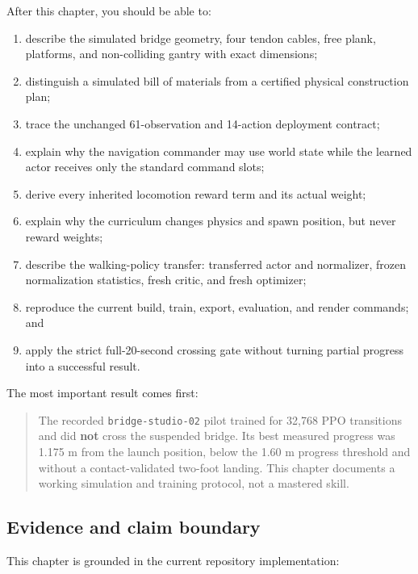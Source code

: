 \documentclass[
  american,
  11pt,
  letterpaper,
]{article}
\providecommand{\tightlist}{%
  \setlength{\itemsep}{0pt}\setlength{\parskip}{0pt}}
\begin{document}
After this chapter, you should be able to:

\begin{enumerate}
\def\labelenumi{\arabic{enumi}.}
\tightlist
\item
  describe the simulated bridge geometry, four tendon cables, free
  plank, platforms, and non-colliding gantry with exact dimensions;
\item
  distinguish a simulated bill of materials from a certified physical
  construction plan;
\item
  trace the unchanged 61-observation and 14-action deployment contract;
\item
  explain why the navigation commander may use world state while the
  learned actor receives only the standard command slots;
\item
  derive every inherited locomotion reward term and its actual weight;
\item
  explain why the curriculum changes physics and spawn position, but
  never reward weights;
\item
  describe the walking-policy transfer: transferred actor and
  normalizer, frozen normalization statistics, fresh critic, and fresh
  optimizer;
\item
  reproduce the current build, train, export, evaluation, and render
  commands; and
\item
  apply the strict full-20-second crossing gate without turning partial
  progress into a successful result.
\end{enumerate}

The most important result comes first:

\begin{quote}
The recorded \texttt{bridge-\allowbreak{}studio-\allowbreak{}02} pilot
trained for 32,768 PPO transitions and did \textbf{not} cross the
suspended bridge. Its best measured progress was 1.175 m from the launch
position, below the 1.60 m progress threshold and without a
contact-validated two-foot landing. This chapter documents a working
simulation and training protocol, not a mastered skill.
\end{quote}

\subsection{Evidence and claim
boundary}\label{evidence-and-claim-boundary-1}

This chapter is grounded in the current repository implementation:
\end{document}
